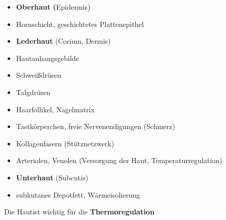 \documentclass{article}
\newcommand\gEs[1]{\textbf{\textcolor[rgb]{0.0,0.0,0.5019608}{#1}}}
\newcommand\gEs[1]{\textbf{\textcolor[rgb]{0.0,0.0,0.5019608}{#1}}}
\newcommand\gZ[1]{\textcolor[rgb]{0.5019608,0.5019608,0.5019608}{#1}}
\begin{document}
\begin{itemize}
\item {\mdseries
{}\textbf{Oberhaut}\textbf{
(}\gZ{Epidermis})}

\end{itemize}
\begin{itemize}
\item {\mdseries
Hornschicht, geschichtetes Plattenepithel}

\end{itemize}
\begin{itemize}
\item {\mdseries
{}\textbf{Lederhaut} (\gZ{Corium,
Dermis})}

\end{itemize}
\begin{itemize}
\item {\mdseries
Hautanhangsgebilde}

\end{itemize}
\begin{itemize}
\item {\mdseries
Schwei{\ss}dr\"usen}

\item {\mdseries
Talgdr\"usen}

\item {\mdseries
Haarfollikel, Nagelmatrix}

\end{itemize}
\begin{itemize}
\item {\mdseries
Tastk\"orperchen, freie Nervenendigungen (Schmerz)}

\item {\mdseries
Kollagenfasern (St\"utznetzwerk)}

\item {\mdseries
Arteriolen, Venolen (Versorgung der Haut, Temperaturregulation)}

\end{itemize}
\begin{itemize}
\item {\mdseries
{}\textbf{Unterhaut} (Subcutis)}

\end{itemize}
\begin{itemize}
\item {\mdseries
subkutanes Depotfett, W\"armeisolierung}

\end{itemize}
{\mdseries\color{black}
Die Hautist wichtig f\"ur die
\gEs{Thermoregulation}}
\end{document}
